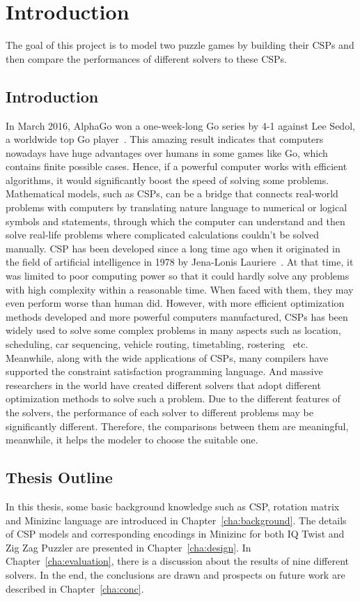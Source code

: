 \chapter{Introduction}
\label{cha:intro}
The goal of this project is to model two puzzle games by building their CSPs and then compare the performances of different solvers to these CSPs.
\section{Introduction}
\label{sec:introduction}
In March 2016, AlphaGo won a one-week-long Go series by 4-1 against Lee Sedol, a worldwide top Go player~\cite{r26}. This amazing result indicates that computers nowadays have huge advantages over humans in some games like Go, which contains finite possible cases. Hence, if a powerful computer works with efficient algorithms, it would significantly boost the speed of solving some problems. Mathematical models, such as CSPs, can be a bridge that connects real-world problems with computers by translating nature language to numerical or logical symbols and statements, through which the computer can understand and then solve real-life problems where complicated calculations couldn’t be solved manually. CSP has been developed since a long time ago when it originated in the field of artificial intelligence in 1978 by Jena-Lonis Lauriere~\cite{r27}. At that time, it was limited to poor computing power so that it could hardly solve any problems with high complexity within a reasonable time. When faced with them, they may even perform worse than human did. However, with more efficient optimization methods developed and more powerful computers manufactured, CSPs has been widely used to solve some complex problems in many aspects such as location, scheduling, car sequencing, vehicle routing, timetabling, rostering~\cite{r28} etc. Meanwhile, along with the wide applications of CSPs, many compilers have supported the constraint satisfaction programming language. And massive researchers in the world have created different solvers that adopt different optimization methods to solve such a problem. Due to the different features of the solvers, the performance of each solver to different problems may be significantly different. Therefore, the comparisons between them are meaningful, meanwhile, it helps the modeler to choose the suitable one.
\section{Thesis Outline}
\label{sec:outline}
In this thesis, some basic background knowledge such as CSP, rotation matrix and Minizinc language are introduced in Chapter~\ref{cha:background}. The details of CSP models and corresponding encodings in Minizinc for both IQ Twist and Zig Zag Puzzler are presented in Chapter~\ref{cha:design}. In Chapter~\ref{cha:evaluation}, there is a discussion about the results of nine different solvers. In the end, the conclusions are drawn and prospects on future work are described in Chapter~\ref{cha:conc}.
